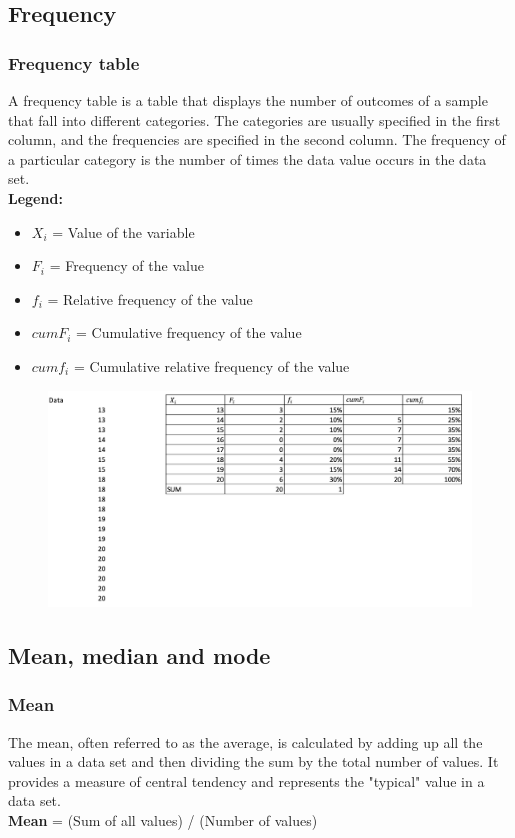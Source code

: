 \documentclass[a4paper,10pt,onecolumn]{article}
\begin{document}
\subsection{Frequency}
\subsubsection{Frequency table}
A frequency table is a table that displays the number of outcomes of a sample that fall into different categories. The categories are usually specified in the first column, and the frequencies are specified in the second column. The frequency of a particular category is the number of times the data value occurs in the data set.
\\
\textbf{Legend:}
\begin{itemize}
    \item $X_i$ = Value of the variable
    \item $F_i$ = Frequency of the value
    \item $f_i$ = Relative frequency of the value
    \item $cumF_i$ = Cumulative frequency of the value
    \item $cumf_i$ = Cumulative relative frequency of the value
  \end{itemize}
\begin{figure}[h]
    \centering
    \includegraphics[width=\textwidth]{freq.png}
    
  \end{figure}
  \newpage
\subsection{Mean, median and mode }
\subsubsection{Mean}
The mean, often referred to as the average, is calculated by adding up all the values in a data set and then dividing the sum by the total number of values. It provides a measure of central tendency and represents the "typical" value in a data set.
\\
\textbf{Mean} = (Sum of all values) / (Number of values)
\end{document}
